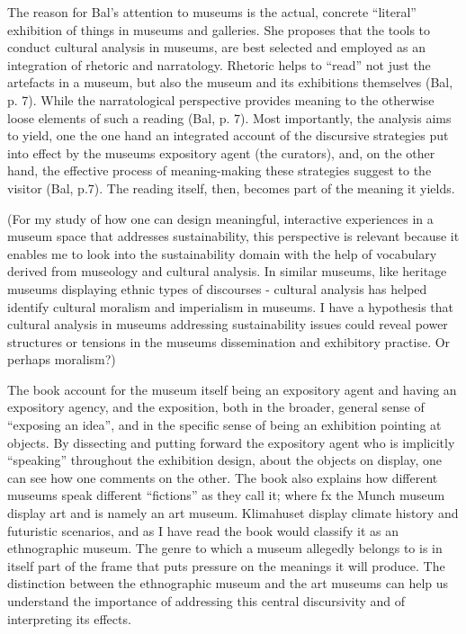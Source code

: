 The reason for Bal’s attention to museums is the actual, concrete “literal” exhibition of things in museums and galleries. She proposes that the tools to conduct cultural analysis in museums, are best selected and employed as an integration of rhetoric and narratology. Rhetoric helps to “read” not just the artefacts in a museum, but also the museum and its exhibitions themselves (Bal, p. 7). While the narratological perspective provides meaning to the otherwise loose elements of such a reading (Bal, p. 7). Most importantly, the analysis aims to yield, one the one hand an integrated account of the discursive strategies put into effect by the museums expository agent (the curators), and, on the other hand, the effective process of meaning-making these strategies suggest to the visitor (Bal, p.7). The reading itself, then, becomes part of the meaning it yields.

(For my study of how one can design meaningful, interactive experiences in a museum space that addresses sustainability, this perspective is relevant because it enables me to look into the sustainability domain with the help of vocabulary derived from museology and cultural analysis. In similar museums, like heritage museums displaying ethnic types of discourses - cultural analysis has helped identify cultural moralism and imperialism in museums. I have a hypothesis that cultural analysis in museums addressing sustainability issues could reveal power structures or tensions in the museums dissemination and exhibitory practise. Or perhaps moralism?)

The book account for the museum itself being an expository agent and having an expository agency, and the exposition, both in the broader, general sense of “exposing an idea”, and in the specific sense of being an exhibition pointing at objects. By dissecting and putting forward the expository agent who is implicitly “speaking” throughout the exhibition design, about the objects on display, one can see how one comments on the other. The book also explains how different museums speak different “fictions” as they call it; where fx the Munch museum display art and is namely an art museum. Klimahuset display climate history and futuristic scenarios, and as I have read the book would classify it as an ethnographic museum. The genre to which a museum allegedly belongs to is in itself part of the frame that puts pressure on the meanings it will produce. The distinction between the ethnographic museum and the art museums can help us understand the importance of addressing this central discursivity and of interpreting its effects.

